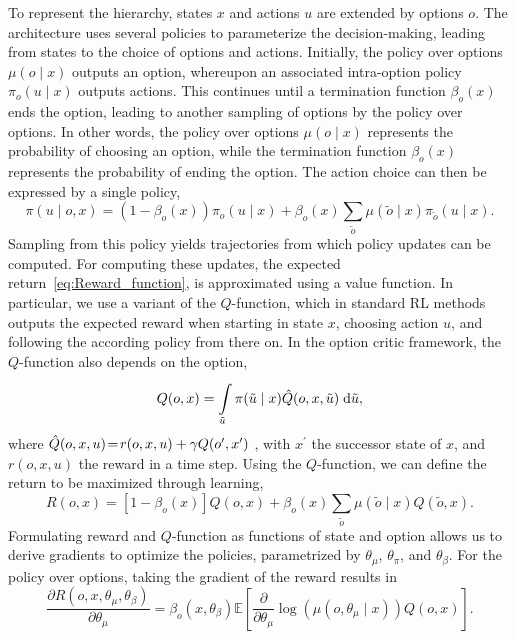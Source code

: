 \documentclass[12pt, final]{l4dc2023}
\begin{document}
To represent the hierarchy, states $x$ and actions $u$ are extended by options $o$. The architecture uses several policies to parameterize the decision-making, leading from states to the choice of options and actions. Initially, the policy over options $\mu(o\mid x)$ outputs an option, whereupon an associated intra-option policy $\pi_{o}(u\mid x)$ outputs actions. This continues until a termination function $\beta_{o}(x)$ ends the option, leading to another sampling of options by the policy over options. In other words, the policy over options $\mu(o\mid x)$ represents the probability of choosing an option, while the termination function $\beta_{o}(x)$ represents the probability of ending the option. 
The action choice can then be expressed by a single policy,
\begin{equation}
    \pi(u\mid o,x)=(1-\beta_o(x))\pi_{o}(u\mid x)+\beta_o(x)\sum_{\tilde{o}}\mu(\tilde{o}\mid x)\pi_{\tilde{o}}(u\mid x).
\end{equation}
Sampling from this policy yields trajectories from which policy updates can be computed. 
For computing these updates, the expected return~\eqref{eq:Reward_function}, is approximated using a value function. 
In particular, we use a variant of the $Q$-function, which in standard RL methods outputs the expected reward when starting in state $x$, choosing action $u$, and following the according policy from there on. 
In the option critic framework, the $Q$-function also depends on the option, \ie
\begin{equation}
    Q(o,x)=\int\limits_{\tilde{u}}^{}\pi(\tilde{u}\mid x)\Hat{Q}(o,x,\tilde{u})\;\text{d}\tilde{u},
\end{equation}
where $\Hat{Q}(o,x,u)\!=\! r(o,x,u)+\gamma Q(o^{\prime},x^{\prime})$ , with $x^{\prime}$ the successor state of $x$, and $r(o,x,u)$ the reward in a time step. Using the $Q$-function, we can define the return to be maximized through learning, 
\begin{equation}
    R(o,x)=\left[1-\beta_{o}(x)\right]Q(o,x)+\beta_{o}(x)\sum_{\tilde{o}}\mu(\tilde{o}\mid x)Q(\tilde{o}, x ).
\end{equation}
Formulating reward and $Q$-function as functions of state and option allows us to derive gradients to optimize the policies, parametrized by $\theta_\mu$, $\theta_\pi$, and $\theta_\beta$. For the policy over options, taking the gradient of the reward results in 
\begin{equation}
    \frac{\partial R (o,x,\theta_\mu ,\theta_\beta )}
    {\partial\theta_\mu }
    = \beta_{o}(x,\theta_\beta ) \mathbb{E} \left[ \frac{\partial}{\partial \theta_\mu}
    \log (\mu(o,\theta_\mu \mid x)) Q (o,x )\right].
    \label{eq:gradients_mu}
\end{equation}
\end{document}
